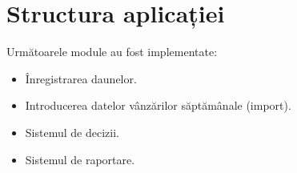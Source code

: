 \section{Structura aplicației}

	Următoarele module au fost implementate:
	\begin{itemize}
		\item Înregistrarea daunelor.
		\item Introducerea datelor vânzărilor săptămânale (import).
		\item Sistemul de decizii.
		\item Sistemul de raportare.
	\end{itemize}
